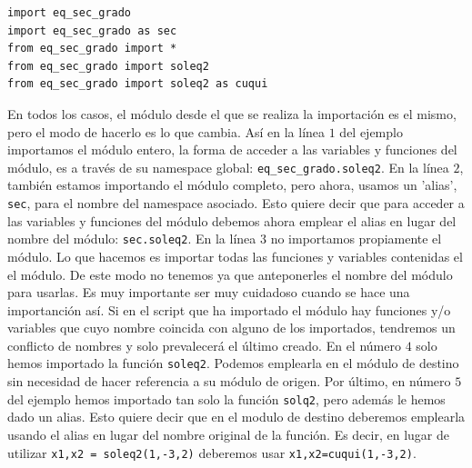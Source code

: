 \begin{verbatim}
import eq_sec_grado
import eq_sec_grado as sec
from eq_sec_grado import *
from eq_sec_grado import soleq2
from eq_sec_grado import soleq2 as cuqui
\end{verbatim}

\begin{paracol}{2}
En todos los casos, el módulo desde el que se realiza la importación es el mismo, pero el modo de hacerlo es lo que cambia. Así en la línea $1$ del ejemplo importamos el módulo entero, la forma de acceder a las variables y funciones del módulo, es a través de su namespace global: \texttt{eq_sec_grado.soleq2}. En la línea $2$, también estamos importando el módulo completo, pero ahora, usamos un 'alias', \texttt{sec},  para el nombre del namespace asociado. Esto quiere decir que para acceder a las variables y funciones del módulo debemos ahora emplear el alias en lugar del nombre del módulo: \texttt{sec.soleq2}. En la línea $3$ no importamos propiamente el módulo. Lo que hacemos es importar todas las funciones y variables contenidas el el módulo. De este modo no tenemos ya que anteponerles el nombre del módulo para usarlas. Es muy importante ser muy cuidadoso cuando se hace una importanción así. Si en el script que ha importado el módulo hay funciones y/o variables que cuyo nombre coincida con alguno de los importados, tendremos un conflicto de nombres y solo prevalecerá el último creado. En el número $4$ solo hemos importado la función \texttt{soleq2}. Podemos emplearla en el módulo de destino sin necesidad de hacer referencia a su módulo de origen. Por último, en número $5$ del ejemplo hemos importado tan solo la función \texttt{solq2}, pero además le hemos dado un alias. Esto quiere decir que en el modulo de destino deberemos emplearla usando el alias en lugar del nombre original de la función. Es decir, en lugar de utilizar \texttt{x1,x2 = soleq2(1,-3,2)} deberemos usar \texttt{x1,x2=cuqui(1,-3,2)}.
\switchcolumn

\end{paracol}
